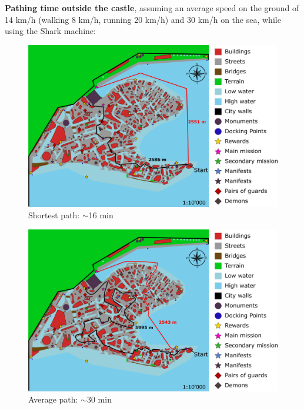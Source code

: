 \textbf{Pathing time outside the castle}, assuming an average speed on the ground of 14 km/h (walking 8 km/h, running 20 km/h) and 30 km/h on the sea, while using the Shark machine:
\begin{figure}[H]
    \centering
	\includegraphics[width=\textwidth]{Images/Diagrams/dynamiapath1.png}
	\caption{Shortest path: $\sim$16 min}
\end{figure}

\begin{figure}[H]
    \centering
	\includegraphics[width=\textwidth]{Images/Diagrams/dynamiapath2.png}
	\caption{Average path: $\sim$30 min}
\end{figure}

